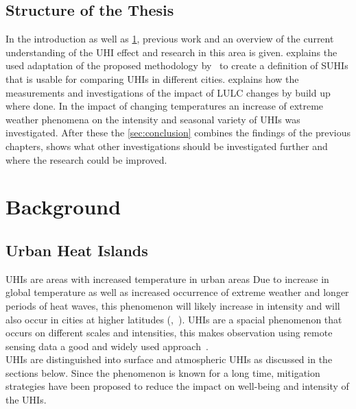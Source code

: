 \documentclass[12pt,a4paper, english]{article}
\begin{document}
  \subsection{Structure of the Thesis}\label{ssec:structure} 
    In the introduction as well as \cref{sec:background}, previous work and an overview of the current understanding of the \gls{UHI} effect and research in this area is given. 
     explains the used adaptation of the proposed methodology by~\cite{Sobrino2020} to create a definition of \glspl{SUHI} that is usable for comparing \glspl{UHI} in different cities.  
     explains how the measurements  and investigations of the impact of \gls{LULC} changes by build up where done.
    In  the impact of changing temperatures an increase of extreme weather phenomena on the intensity and seasonal variety of \glspl{UHI} was investigated. 
    After these the \cref{sec:conclusion} combines the findings of the previous chapters, shows what other investigations should be investigated further and where the research could be improved. 
%
\newpage
\section{Background}\label{sec:background}
  \subsection{Urban Heat Islands}
    \glspl{UHI} are areas with increased temperature in urban areas
    Due to increase in global temperature as well as increased occurrence of extreme weather and longer periods of heat waves, this phenomenon will likely increase in intensity and will also occur in cities at higher latitudes (\cite{Sachindra2016},~\cite[p.~904]{Wilby2008}).
    \glspl{UHI} are a spacial phenomenon that occurs on different scales and intensities, this makes observation using remote sensing data a good and widely used approach~\autocite{Weng2003}.\\
    \glspl{UHI} are distinguished into surface and atmospheric \glspl{UHI} as discussed in the sections below. 
    Since the phenomenon is known for a long time, mitigation strategies have been proposed to reduce the impact on well-being and intensity of the \glspl{UHI}.
%
\end{document}
